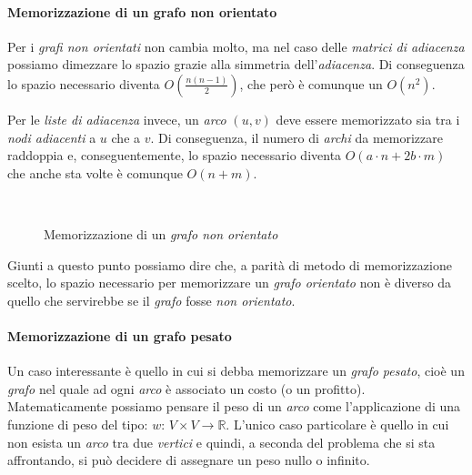 \paragraph{Memorizzazione di un grafo non orientato}
Per i \emph{grafi non orientati} non cambia molto, ma nel caso delle
\emph{matrici di adiacenza} possiamo dimezzare lo spazio grazie alla simmetria
dell'\emph{adiacenza}. Di conseguenza lo spazio necessario diventa $O(\frac{n(n-1)}
{2})$, che però è comunque un $O(n^2)$.

Per le \emph{liste di adiacenza} invece, un \emph{arco} $(u,v)$ deve essere
memorizzato sia tra i \emph{nodi adiacenti} a $u$ che a $v$. Di conseguenza, il
numero di \emph{archi} da memorizzare raddoppia e, conseguentemente, lo spazio
necessario diventa $O(a\cdot n+2b\cdot m)$ che anche sta volte è comunque $O(n+m)$.

\begin{figure}[h!]
    \centering
    \\
    \hfill
    \caption{Memorizzazione di un \emph{grafo non orientato}}
\end{figure}\noindent
Giunti a questo punto possiamo dire che, a parità di metodo di
memorizzazione scelto, lo spazio necessario per memorizzare un \emph{grafo orientato}
non è diverso da quello che servirebbe se il \emph{grafo} fosse \emph{non orientato}.

\paragraph{Memorizzazione di un grafo pesato}
Un caso interessante è quello in cui si debba memorizzare un \emph{grafo pesato},
cioè un \emph{grafo} nel quale ad ogni \emph{arco} è associato un costo (o un
profitto). Matematicamente possiamo pensare il peso di un \emph{arco} come
l'applicazione di una funzione di peso del tipo: $w:\,V\times V\to\mathbb{R}$.
L'unico caso particolare è quello in cui non esista un \emph{arco} tra due
\emph{vertici} e quindi, a seconda del problema che si sta affrontando, si può
decidere di assegnare un peso nullo o infinito.

